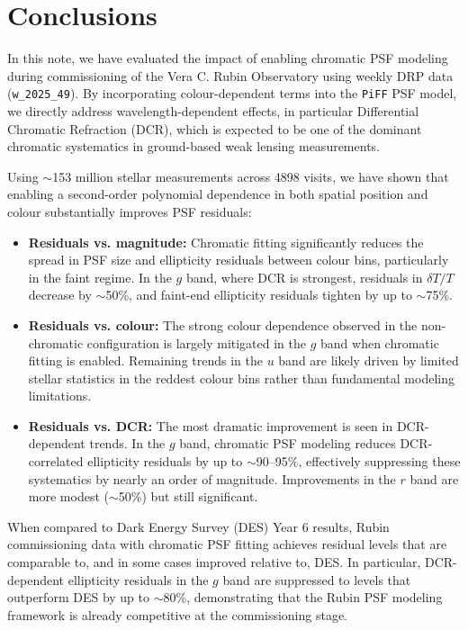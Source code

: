 \section{Conclusions}

In this note, we have evaluated the impact of enabling chromatic PSF modeling during commissioning of the Vera C. Rubin Observatory using weekly DRP data (\texttt{w\_2025\_49}). By incorporating colour-dependent terms into the \texttt{PiFF} PSF model, we directly address wavelength-dependent effects, in particular Differential Chromatic Refraction (DCR), which is expected to be one of the dominant chromatic systematics in ground-based weak lensing measurements.

Using $\sim$153 million stellar measurements across 4898 visits, we have shown that enabling a second-order polynomial dependence in both spatial position and colour substantially improves PSF residuals:

\begin{itemize}
    \item \textbf{Residuals vs. magnitude:} Chromatic fitting significantly reduces the spread in PSF size and ellipticity residuals between colour bins, particularly in the faint regime. In the $g$ band, where DCR is strongest, residuals in $\delta T/T$ decrease by $\sim$50\%, and faint-end ellipticity residuals tighten by up to $\sim$75\%.
    
    \item \textbf{Residuals vs. colour:} The strong colour dependence observed in the non-chromatic configuration is largely mitigated in the $g$ band when chromatic fitting is enabled. Remaining trends in the $u$ band are likely driven by limited stellar statistics in the reddest colour bins rather than fundamental modeling limitations.
    
    \item \textbf{Residuals vs. DCR:} The most dramatic improvement is seen in DCR-dependent trends. In the $g$ band, chromatic PSF modeling reduces DCR-correlated ellipticity residuals by up to $\sim$90--95\%, effectively suppressing these systematics by nearly an order of magnitude. Improvements in the $r$ band are more modest ($\sim$50\%) but still significant.
\end{itemize}

When compared to Dark Energy Survey (DES) Year 6 results, Rubin commissioning data with chromatic PSF fitting achieves residual levels that are comparable to, and in some cases improved relative to, DES. In particular, DCR-dependent ellipticity residuals in the $g$ band are suppressed to levels that outperform DES by up to $\sim$80\%, demonstrating that the Rubin PSF modeling framework is already competitive at the commissioning stage.

